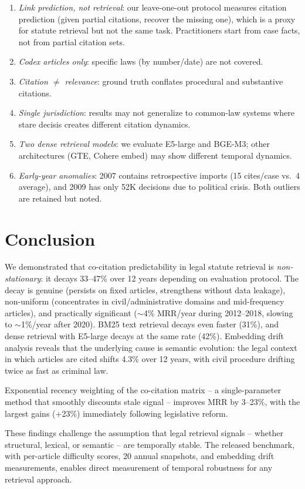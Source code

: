 \documentclass[11pt]{article}
\begin{document}
\begin{enumerate}[nosep,leftmargin=*]
  \item \emph{Link prediction, not retrieval}: our leave-one-out protocol measures citation prediction (given partial citations, recover the missing one), which is a proxy for statute retrieval but not the same task. Practitioners start from case facts, not from partial citation sets.
  \item \emph{Codex articles only}: specific laws (by number/date) are not covered.
  \item \emph{Citation $\neq$ relevance}: ground truth conflates procedural and substantive citations.
  \item \emph{Single jurisdiction}: results may not generalize to common-law systems where stare decisis creates different citation dynamics.
  \item \emph{Two dense retrieval models}: we evaluate E5-large and BGE-M3; other architectures (GTE, Cohere embed) may show different temporal dynamics.
  \item \emph{Early-year anomalies}: 2007 contains retrospective imports (15 cites/case vs.\ 4 average), and 2009 has only 52K decisions due to political crisis. Both outliers are retained but noted.
\end{enumerate}

\section{Conclusion}
\label{sec:conclusion}

We demonstrated that co-citation predictability in legal statute retrieval is \emph{non-stationary}: it decays 33--47\% over 12 years depending on evaluation protocol.
The decay is genuine (persists on fixed articles, strengthens without data leakage), non-uniform (concentrates in civil/administrative domains and mid-frequency articles), and practically significant ($\sim$4\% MRR/year during 2012--2018, slowing to $\sim$1\%/year after 2020).
BM25 text retrieval decays even faster (31\%), and dense retrieval with E5-large decays at the same rate (42\%).
Embedding drift analysis reveals that the underlying cause is semantic evolution: the legal context in which articles are cited shifts 4.3\% over 12 years, with civil procedure drifting twice as fast as criminal law.

Exponential recency weighting of the co-citation matrix -- a single-parameter method that smoothly discounts stale signal -- improves MRR by 3--23\%, with the largest gains (+23\%) immediately following legislative reform.

These findings challenge the assumption that legal retrieval signals -- whether structural, lexical, or semantic -- are temporally stable.
The released benchmark, with per-article difficulty scores, 20 annual snapshots, and embedding drift measurements, enables direct measurement of temporal robustness for any retrieval approach.



\end{document}
